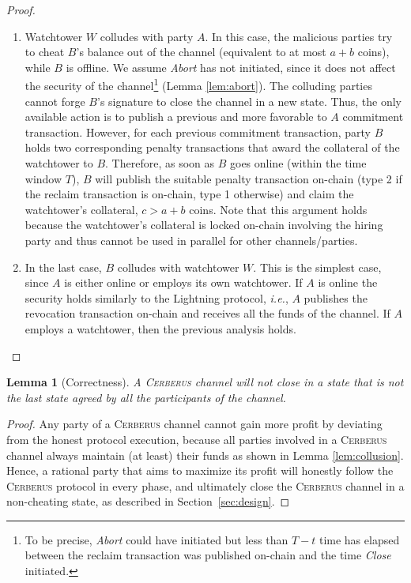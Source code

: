 \documentclass[twocolumn,showpacs,%
  nofootinbib,aps,superscriptaddress,%
  eqsecnum,prd,notitlepage,showkeys,10pt]{revtex4-1}
\newtheorem{lemma}{Lemma}
\newcommand{\ie}{{\em i.e.}}
\newcommand{\sys}{\textsc{Cerberus}\xspace}
\begin{document}
\begin{proof}
\begin{enumerate}[label=(\roman*)]
    \item Watchtower $W$ colludes with party $A$.
    In this case, the malicious parties try to cheat $B$'s balance out of the channel (equivalent to at most $a+b$ coins), while $B$ is offline.
    We assume \textit{Abort} has not initiated, since it does not affect the security of the channel\footnote{To be precise, \textit{Abort} could have initiated but less than $T-t$ time has elapsed between the reclaim transaction was published on-chain and the time \textit{Close} initiated.} (Lemma \ref{lem:abort}).
    The colluding parties cannot forge $B$'s signature to close the channel in a new state. Thus, the only available action is to publish a previous and more favorable to $A$ commitment transaction.
    However, for each previous commitment transaction, party $B$ holds two corresponding penalty transactions that award the collateral of the watchtower to $B$. Therefore, as soon as $B$ goes online (within the time window $T$), $B$ will publish the suitable penalty transaction on-chain (type 2 if the reclaim transaction is on-chain, type 1 otherwise) and claim the watchtower's collateral, $c>a+b$ coins.
    Note that this argument holds because the watchtower's collateral is locked on-chain involving the hiring party and thus cannot be used in parallel for other channels/parties.

    \item In the last case, $B$ colludes with watchtower $W$.
    This is the simplest case, since $A$ is either online or employs its own watchtower. If $A$ is online the security holds similarly to the Lightning protocol, \ie, $A$ publishes the revocation transaction on-chain and receives all the funds of the channel. If $A$ employs a watchtower, then the previous analysis holds.
 \end{enumerate}
\end{proof}

\begin{lemma}[Correctness]\label{lem:correctness}
A \sys channel will not close in a state that is not the last state agreed by all the participants of the channel.
\end{lemma}
\begin{proof}
Any party of a \sys channel cannot gain more profit by deviating from the honest protocol execution, because all parties involved in a \sys channel always maintain (at least) their funds as shown in Lemma \ref{lem:collusion}. Hence, a rational party that aims to maximize its profit will honestly follow the \sys protocol in every phase, and ultimately close the \sys channel in a non-cheating state, as described in Section~\ref{sec:design}.
\end{proof}
\end{document}
